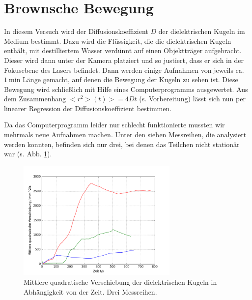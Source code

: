 \section{Brownsche Bewegung}

In diesem Versuch wird der Diffusionskoeffizient $D$ der dielektrischen Kugeln im Medium bestimmt. Dazu wird die Flüssigkeit, die die dielektrischen Kugeln enthält, mit destilliertem Wasser verdünnt auf einen Objektträger aufgebracht.
Dieser wird dann unter der Kamera platziert und so justiert, dass er sich in der Fokusebene des Lasers befindet. Dann werden einige Aufnahmen von jeweils ca. $\SI{1}{\minute}$ Länge gemacht, auf denen die Bewegung der Kugeln zu sehen ist.
Diese Bewegung wird schließlich mit Hilfe eines Computerprogramms ausgewertet. Aus dem Zusammenhang $<r^{2}>(t)>=4Dt$ (s. Vorbereitung) lässt sich nun per linearer Regression der Diffusionskoeffizient bestimmen.

Da das Computerprogramm leider nur schlecht funktionierte mussten wir mehrmals neue Aufnahmen machen. Unter den sieben Messreihen, die analysiert werden konnten, befinden sich nur drei, bei denen das Teilchen nicht stationär war (s. Abb. \ref{fig:brown_einzeln}).

\begin{figure}[tb]
	\centering\includegraphics[width=0.7\textwidth]{fig/brown_einzeln.png}
	\caption{Mittlere quadratische Verschiebung der dielektrischen Kugeln in Abhängigkeit von der Zeit. Drei Messreihen.}
	\label{fig:brown_einzeln}
\end{figure}

